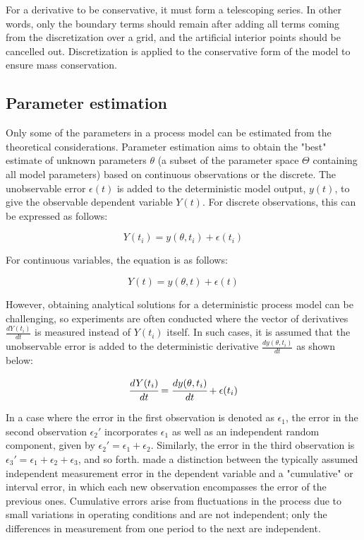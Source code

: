 \documentclass[a4paper,fleqn]{cas-dc}
\begin{document}
			For a derivative to be conservative, it must form a telescoping series. In other words, only the boundary terms should remain after adding all terms coming from the discretization over a grid, and the artificial interior points should be cancelled out. Discretization is applied to the conservative form of the model to ensure mass conservation.
			
			\subsection{Parameter estimation} \label{CH: Parameter_estimation}
			
			Only some of the parameters in a process model can be estimated from the theoretical considerations. Parameter estimation aims to obtain the "best" estimate of unknown parameters $\theta$ (a subset of the parameter space $\Theta$ containing all model parameters) based on continuous observations or the discrete. The unobservable error $\epsilon(t)$ is added to the deterministic model output, $y(t)$, to give the observable dependent variable $Y(t)$. For discrete observations, this can be expressed as follows:
			
			{\footnotesize
				\begin{equation*}
					Y(t_i) = y(\theta, t_i) + \epsilon(t_i)
			\end{equation*} }
			
			For continuous variables, the equation is as follows:
			
			{\footnotesize
				\begin{equation*}
					Y(t) = y(\theta, t) + \epsilon(t)
			\end{equation*} }
			
			However, obtaining analytical solutions for a deterministic process model can be challenging, so experiments are often conducted where the vector of derivatives $\frac{dY(t_i)}{dt}$ is measured instead of $Y(t_i)$ itself. In such cases, it is assumed that the unobservable error is added to the deterministic derivative $\frac{dy(\theta, t_i)}{dt}$ as shown below:
			
			{\footnotesize
				\begin{equation}  \label{EQ: Measurment_noise}
					\cfrac{d Y(t_i)}{dt} = \cfrac{dy(\theta, t_i)}{dt} + \epsilon(t_i)
			\end{equation} }
			
			In a case where the error in the first observation is denoted as $\epsilon_1$, the error in the second observation $\epsilon_2'$ incorporates $\epsilon_1$ as well as an independent random component, given by $\epsilon_2' = \epsilon_1 + \epsilon_2$. Similarly, the error in the third observation is $\epsilon_3' = \epsilon_1 + \epsilon_2 + \epsilon_3$, and so forth. \citet{Mandel1957}  made a distinction between the typically assumed independent measurement error in the dependent variable and a "cumulative" or interval error, in which each new observation encompasses the error of the previous ones. Cumulative errors arise from fluctuations in the process due to small variations in operating conditions and are not independent; only the differences in measurement from one period to the next are independent.
			
\end{document}
